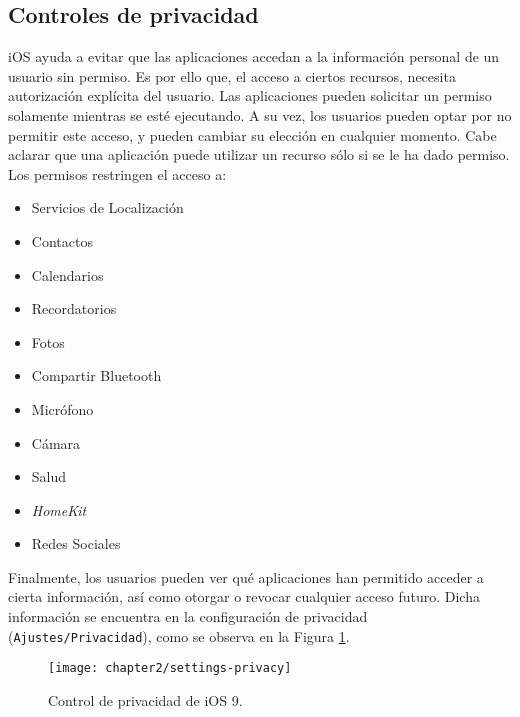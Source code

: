 \subsection{Controles de privacidad}
iOS ayuda a evitar que las aplicaciones accedan a la información personal de un usuario sin permiso. Es por ello que, el acceso a ciertos recursos, necesita autorización explícita del usuario. Las aplicaciones pueden solicitar un permiso solamente mientras se esté ejecutando. A su vez, los usuarios pueden optar por no permitir este acceso, y pueden cambiar su elección en cualquier momento. Cabe aclarar que una aplicación puede utilizar un recurso sólo si se le ha dado permiso.\\
Los permisos restringen el acceso a:
\begin{multicols}{2}
    \begin{itemize}
        \item Servicios de Localización
        \item Contactos
        \item Calendarios
        \item Recordatorios
        \item Fotos
        \item Compartir Bluetooth
        \item Micrófono
        \item Cámara
        \item Salud
        \item \textit{HomeKit}
        \item Redes Sociales
    \end{itemize} 
\end{multicols}
Finalmente, los usuarios pueden ver qué aplicaciones han permitido acceder a cierta información, así como otorgar o revocar cualquier acceso futuro. Dicha información se encuentra en la configuración de privacidad (\texttt{Ajustes/Privacidad}), como se observa en la Figura \ref{fig:ch02:permissions-capture}.\\
\begin{figure}[hbtp]
    \centering
    \texttt{[image: chapter2/settings-privacy]}
    \caption{Control de privacidad de iOS 9.}
	\label{fig:ch02:permissions-capture}
\end{figure}
